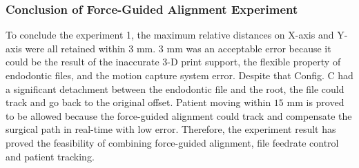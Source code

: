 \subsubsection{Conclusion of Force-Guided Alignment Experiment}
\hspace*{6mm}To conclude the experiment 1, the maximum relative distances on X-axis and Y-axis were all retained within $3$ mm. $3$ mm was an acceptable error because it could be the result of the inaccurate 3-D print support, the flexible property of endodontic files, and the motion capture system error. Despite that Config. C had a significant detachment between the endodontic file and the root, the file could track and go back to the original offset. Patient moving within $15$ mm is proved to be allowed because the force-guided alignment could track and compensate the surgical path in real-time with low error. Therefore, the experiment result has proved the feasibility of combining force-guided alignment, file feedrate control and patient tracking.

\newpage

